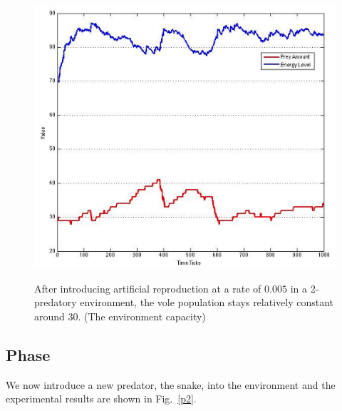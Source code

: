 \documentclass[10pt,conference,letterpaper,doublecolumn]{IEEEtran}
\begin{document}
\begin{figure}[H]
  \centering
  \includegraphics[scale=0.35]{with_mating.png} \\
  \caption{After introducing artificial reproduction at a rate of $0.005$ in a 2-predatory environment, the vole population stays relatively constant around 30. (The environment capacity)}
  \label{with}
\end{figure}

\subsection{Phase \uppercase\expandafter{}}

We now introduce a new predator, the snake, into the environment and the experimental results are shown in Fig.~\ref{p2}.
\end{document}
